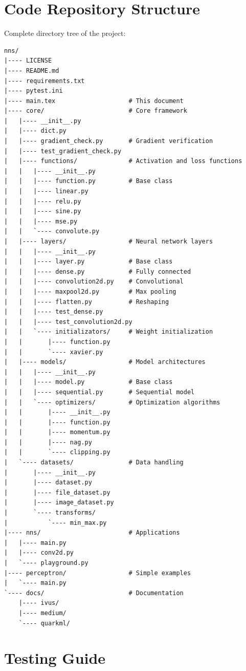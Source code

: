 \documentclass[12pt,a4paper]{article}
\begin{document}
\section{Code Repository Structure}

Complete directory tree of the project:

\begin{verbatim}
nns/
|---- LICENSE
|---- README.md
|---- requirements.txt
|---- pytest.ini
|---- main.tex                    # This document
|---- core/                       # Core framework
|   |---- __init__.py
|   |---- dict.py
|   |---- gradient_check.py       # Gradient verification
|   |---- test_gradient_check.py
|   |---- functions/              # Activation and loss functions
|   |   |---- __init__.py
|   |   |---- function.py         # Base class
|   |   |---- linear.py
|   |   |---- relu.py
|   |   |---- sine.py
|   |   |---- mse.py
|   |   `---- convolute.py
|   |---- layers/                 # Neural network layers
|   |   |---- __init__.py
|   |   |---- layer.py            # Base class
|   |   |---- dense.py            # Fully connected
|   |   |---- convolution2d.py    # Convolutional
|   |   |---- maxpool2d.py        # Max pooling
|   |   |---- flatten.py          # Reshaping
|   |   |---- test_dense.py
|   |   |---- test_convolution2d.py
|   |   `---- initializators/     # Weight initialization
|   |       |---- function.py
|   |       `---- xavier.py
|   |---- models/                 # Model architectures
|   |   |---- __init__.py
|   |   |---- model.py            # Base class
|   |   |---- sequential.py       # Sequential model
|   |   `---- optimizers/         # Optimization algorithms
|   |       |---- __init__.py
|   |       |---- function.py
|   |       |---- momentum.py
|   |       |---- nag.py
|   |       `---- clipping.py
|   `---- datasets/               # Data handling
|       |---- __init__.py
|       |---- dataset.py
|       |---- file_dataset.py
|       |---- image_dataset.py
|       `---- transforms/
|           `---- min_max.py
|---- nns/                        # Applications
|   |---- main.py
|   |---- conv2d.py
|   `---- playground.py
|---- perceptron/                 # Simple examples
|   `---- main.py
`---- docs/                       # Documentation
    |---- ivus/
    |---- medium/
    `---- quarkml/
\end{verbatim}

\section{Testing Guide}
\end{document}
